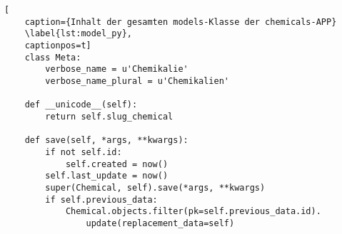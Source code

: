 \begin{lstlisting}[
    caption={Inhalt der gesamten models-Klasse der chemicals-APP}
    \label{lst:model_py},
    captionpos=t]
    class Meta:
        verbose_name = u'Chemikalie'
        verbose_name_plural = u'Chemikalien'

    def __unicode__(self):
        return self.slug_chemical

    def save(self, *args, **kwargs):
        if not self.id:
            self.created = now()
        self.last_update = now()
        super(Chemical, self).save(*args, **kwargs)
        if self.previous_data:
            Chemical.objects.filter(pk=self.previous_data.id).
                update(replacement_data=self)
\end{lstlisting}
